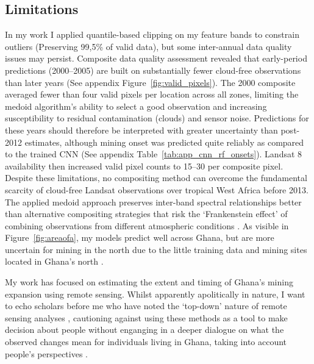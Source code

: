 \documentclass[]{interact}
\begin{document}
\subsection{Limitations}
In my work I applied quantile-based clipping on my feature bands to constrain outliers (Preserving 99,5\% of valid data), but some inter-annual data quality issues may persist. Composite data quality assessment revealed that early-period predictions (2000–2005) are built on substantially fewer cloud-free observations than later years (See appendix Figure~\ref{fig:valid_pixels}). The 2000 composite averaged fewer than four valid pixels per location across all zones, limiting the medoid algorithm's ability to select a good observation and increasing susceptibility to residual contamination (clouds) and sensor noise. Predictions for these years should therefore be interpreted with greater uncertainty than post-2012 estimates, although mining onset was predicted quite reliably as compared to the trained CNN (See appendix Table~\ref{tab:app_cnn_rf_onsets}). Landsat 8 availability then increased valid pixel counts to 15–30 per composite pixel. Despite these limitations, no compositing method can overcome the fundamental scarcity of cloud-free Landsat observations over tropical West Africa before 2013. The applied medoid approach preserves inter-band spectral relationships better than alternative compositing strategies that risk the `Frankenstein effect' of combining observations from different atmospheric conditions \citep{flood2013Seasonal}. As visible in Figure~\ref{fig:areaofa}, my models predict well across Ghana, but are more uncertain for mining in the north due to the little training data and mining sites located in Ghana's north \citep{maus2022update}. 

My work has focused on estimating the extent and timing of Ghana's mining expansion using remote sensing. Whilst apparently apolitically in nature, I want to echo scholars before me who have noted the `top-down' nature of remote sensing analyses \citep[p.9]{barenblitt2021large}, cautioning against using these methods as a tool to make decision about people without enganging in a deeper dialogue on what the observed changes mean for individuals living in Ghana, taking into account people's perspectives \citep{rutazibwa2023inclusion,lund2013Introduction}.
\end{document}
